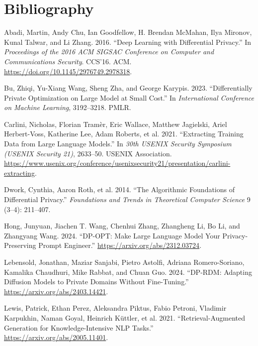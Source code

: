 \documentclass[
  12pt,
  a4paper,
]{article}
\newlength{\cslhangindent}
\newenvironment{CSLReferences}[2] %
 {\begin{list}{}{%
  \setlength{\itemindent}{0pt}
  \setlength{\leftmargin}{0pt}
  \setlength{\parsep}{0pt}
  \ifodd #1
   \setlength{\leftmargin}{\cslhangindent}
   \setlength{\itemindent}{-1\cslhangindent}
  \fi
  \setlength{\itemsep}{#2\baselineskip}}}
 {\end{list}}
\begin{document}
\section{Bibliography}\label{refs}
\begin{CSLReferences}{1}{0}
Abadi, Martin, Andy Chu, Ian Goodfellow, H. Brendan McMahan, Ilya
Mironov, Kunal Talwar, and Li Zhang. 2016. {``Deep Learning with
Differential Privacy.''} In \emph{Proceedings of the 2016 ACM SIGSAC
Conference on Computer and Communications Security}. CCS'16. ACM.
\url{https://doi.org/10.1145/2976749.2978318}.

Bu, Zhiqi, Yu-Xiang Wang, Sheng Zha, and George Karypis. 2023.
{``Differentially Private Optimization on Large Model at Small Cost.''}
In \emph{International Conference on Machine Learning}, 3192--3218.
PMLR.

Carlini, Nicholas, Florian Tramèr, Eric Wallace, Matthew Jagielski,
Ariel Herbert-Voss, Katherine Lee, Adam Roberts, et al. 2021.
{``Extracting Training Data from Large Language Models.''} In \emph{30th
USENIX Security Symposium (USENIX Security 21)}, 2633--50. USENIX
Association.
\url{https://www.usenix.org/conference/usenixsecurity21/presentation/carlini-extracting}.

Dwork, Cynthia, Aaron Roth, et al. 2014. {``The Algorithmic Foundations
of Differential Privacy.''} \emph{Foundations and
Trends{\textregistered} in Theoretical Computer Science} 9 (3--4):
211--407.

Hong, Junyuan, Jiachen T. Wang, Chenhui Zhang, Zhangheng Li, Bo Li, and
Zhangyang Wang. 2024. {``DP-OPT: Make Large Language Model Your
Privacy-Preserving Prompt Engineer.''}
\url{https://arxiv.org/abs/2312.03724}.

Lebensold, Jonathan, Maziar Sanjabi, Pietro Astolfi, Adriana
Romero-Soriano, Kamalika Chaudhuri, Mike Rabbat, and Chuan Guo. 2024.
{``DP-RDM: Adapting Diffusion Models to Private Domains Without
Fine-Tuning.''} \url{https://arxiv.org/abs/2403.14421}.

Lewis, Patrick, Ethan Perez, Aleksandra Piktus, Fabio Petroni, Vladimir
Karpukhin, Naman Goyal, Heinrich Küttler, et al. 2021.
{``Retrieval-Augmented Generation for Knowledge-Intensive NLP Tasks.''}
\url{https://arxiv.org/abs/2005.11401}.


\end{CSLReferences}
\end{document}
